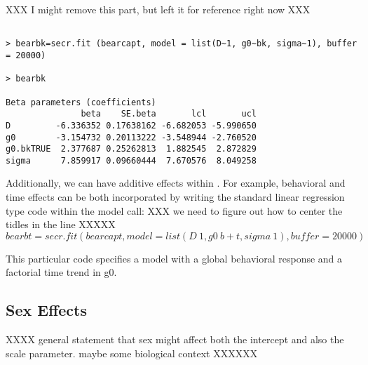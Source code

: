 XXX I might remove this part, but left it for reference right now XXX
{\small
\begin{verbatim}

> bearbk=secr.fit (bearcapt, model = list(D~1, g0~bk, sigma~1), buffer = 20000)

> bearbk

Beta parameters (coefficients) 
               beta    SE.beta       lcl       ucl
D         -6.336352 0.17638162 -6.682053 -5.990650
g0        -3.154732 0.20113222 -3.548944 -2.760520
g0.bkTRUE  2.377687 0.25262813  1.882545  2.872829
sigma      7.859917 0.09660444  7.670576  8.049258
\end{verbatim}
}

Additionally, we can have additive effects within \secr.  For example, behavioral and time effects can be both incorporated by writing the standard linear regression type code within the model call:
XXX we need to figure out how to center the tidles in the line XXXXX
\[
bearbt=secr.fit (bearcapt, model = list(D~1, g0~b + t, sigma~1), buffer = 20000)
\]

This particular code specifies a model with a global behavioral response and a factorial time trend in g0.


\subsection{Sex Effects}



XXXX general statement that sex might affect both the intercept and
also the scale parameter. maybe some biological context XXXXXX

